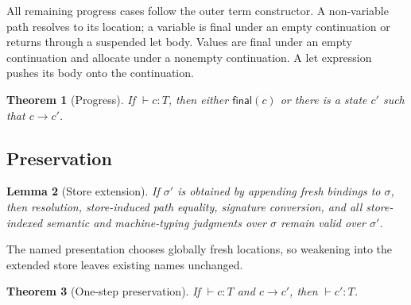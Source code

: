 \documentclass[acmsmall,screen,nonacm]{acmart}
\newtheorem{theorem}{Theorem}
\newtheorem{lemma}[theorem]{Lemma}
\newcommand{\final}{\mathsf{final}}
\newcommand{\sstep}{\longrightarrow}
\begin{document}
All remaining progress cases follow the outer term constructor. A
non-variable path resolves to its location; a variable is final under an empty
continuation or returns through a suspended let body. Values are final under
an empty continuation and allocate under a nonempty continuation. A let
expression pushes its body onto the continuation.

\begin{theorem}[Progress]
\label{thm:progress}
If \(\vdash c:T\), then either \(\final(c)\) or there is a state
\(c'\) such that \(c\sstep c'\).
\end{theorem}

\subsection{Preservation}

\begin{lemma}[Store extension]
\label{lem:store-extension}
If \(\sigma'\) is obtained by appending fresh bindings to \(\sigma\), then
resolution, store-induced path equality, signature conversion, and all
store-indexed semantic and machine-typing judgments over \(\sigma\) remain
valid over \(\sigma'\).
\end{lemma}

The named presentation chooses globally fresh locations, so weakening into
the extended store leaves existing names unchanged.

\begin{theorem}[One-step preservation]
\label{thm:preservation}
If \(\vdash c:T\) and \(c\sstep c'\), then \(\vdash c':T\).
\end{theorem}
\end{document}
